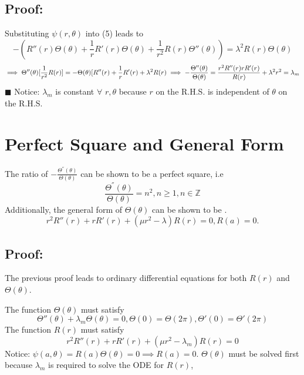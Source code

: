 \documentclass{article}
\begin{document}
\subsection{Proof:}
Substituting $\psi(r,\theta)$ into (5) leads to
\begin{equation*}
-(R''(r)\Theta(\theta) + \frac{1}{r}R'(r)\Theta(\theta)+\frac{1}{r^2}R(r)\Theta''(\theta))=\lambda^2 R(r)\Theta(\theta)
\end{equation*}\begin{equation*}
\implies \Theta''(\theta)[\frac{1}{r^2}R(r)]=-\Theta(\theta)[R''(r)+\frac{1}{r}R'(r)+\lambda^2 R(r) \newline \implies -\frac{\Theta''(\theta)}{\Theta(\theta)}=\frac{r^2 R''(r)rR'(r)}{R(r)}+\lambda^2 r^2=\lambda_m
\end{equation*}
$\blacksquare$ 
Notice: $\lambda_m$ is constant $\forall$ $r, \theta$ because $r$ on the R.H.S. is independent of $\theta$ on the R.H.S. 
\section{Perfect Square and General Form}
The ratio of $-\frac{\Theta^{''}(\theta)}{\Theta(\theta)}$ can be shown to be a perfect square, i.e
\begin{equation}
    \frac{\Theta^{''}(\theta)}{\Theta(\theta)}=n^2, n \geq 1, n \in \mathbb{Z}
\end{equation}
Additionally, the general form of $\Theta(\theta)$ can be shown to be .
\begin{equation*}
	r^2 R''(r)+rR'(r)+(\mu r^2 - \lambda)R(r)=0, R(a)=0.
\end{equation*}
\subsection{Proof:}
The previous proof leads to ordinary differential equations for both $R(r)$ and $\Theta(\theta)$.

The function $\Theta(\theta)$ must satisfy
\begin{equation*}
	\Theta''(\theta)+\lambda_m \Theta(\theta)=0, \Theta(0)=\Theta(2 \pi), \Theta'(0)=\Theta'(2\pi)
\end{equation*}
The function $R(r)$ must satisfy
\begin{equation*}
	r^2 R''(r)+rR'(r)+(\mu r^2 -\lambda_m)R(r)=0
\end{equation*}Notice: $\psi(a,\theta)=R(a)\Theta(\theta)=0 \implies R(a)=0.$
$\Theta(\theta)$ must be solved first because $\lambda_m$ is required to solve the ODE for $R(r)$, 
\end{document}
